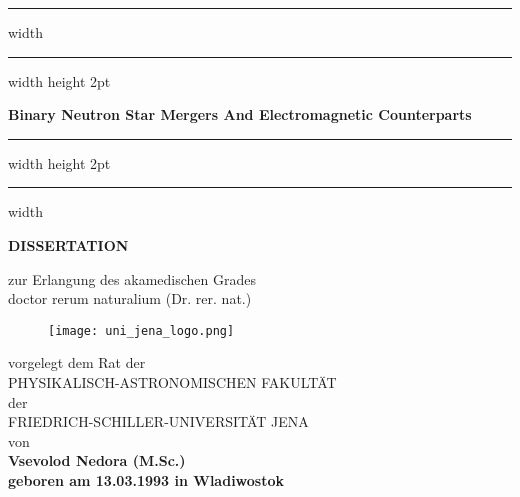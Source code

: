 \documentclass[
openright,
12pt, %
english,%
onehalfspacing, %
nolistspacing, %
nohyperref, %
headsepline, %
]{MastersDoctoralThesis} %
\begin{document}
\frontmatter %
\pagestyle{plain} %


\begin{titlepage}
    \begin{center}
        \centering
        {\hrule width \hsize \kern 1mm \hrule width \hsize height 2pt}
        \vspace{5mm}
        \huge 
        \textbf{Binary Neutron Star Mergers And Electromagnetic Counterparts}\\
        \vspace{5mm}
        {\hrule width \hsize height 2pt \kern 1mm  \hrule width \hsize }
        
        \vspace{1.4cm}
        
        \LARGE 
        \textbf{DISSERTATION} 
        
        \vspace{0.60cm}
        
        \large
        zur Erlangung des akamedischen Grades\\
        doctor rerum naturalium (Dr. rer. nat.)
        \vspace{0.8cm}
        
        \begin{figure}[!ht]
            \centering
            \texttt{[image: uni\_jena\_logo.png]}
        \end{figure}
        
        \vspace{0.8cm}
        vorgelegt dem Rat der \\
        \vspace{0.3cm}
        PHYSIKALISCH-ASTRONOMISCHEN FAKULT{\"A}T \\
        \vspace{0.3cm}
        der \\
        \vspace{0.3cm}
        FRIEDRICH-SCHILLER-UNIVERSIT{\"A}T JENA \\
        \vspace{0.3cm}
        von \\
        \vspace{0.3cm}
        \bf{Vsevolod Nedora (M.Sc.)} \\
        \vspace{0.3cm}
        geboren am 13.03.1993 in Wladiwostok
        
    \end{center}
    
\end{titlepage}
\end{document}
